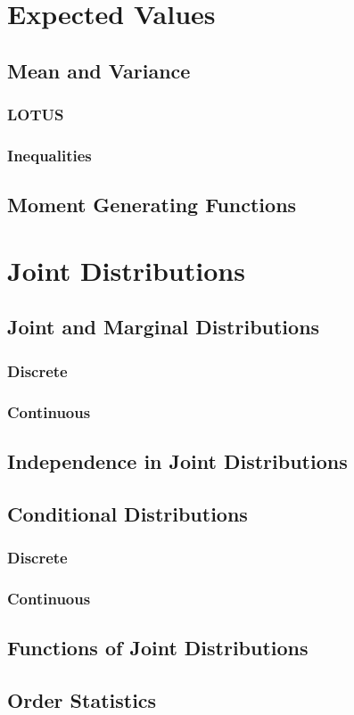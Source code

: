 \documentclass[a4paper,10pt]{article}
\begin{document}
\newpage
\section{Expected Values}

\subsection{Mean and Variance}
\subsubsection{LOTUS}
\subsubsection{Inequalities}

\subsection{Moment Generating Functions}



\newpage
\section{Joint Distributions}

\subsection{Joint and Marginal Distributions}
\subsubsection{Discrete}
\subsubsection{Continuous}

\subsection{Independence in Joint Distributions}

\subsection{Conditional Distributions}
\subsubsection{Discrete}
\subsubsection{Continuous}

\subsection{Functions of Joint Distributions}

\subsection{Order Statistics}
\end{document}
